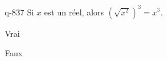 \begin{truefalse}{q-837}
Si $x$ est un réel, alors $(\sqrt{x^2})^3 = x^3$.
\item Vrai
\item* Faux
\end{truefalse}

